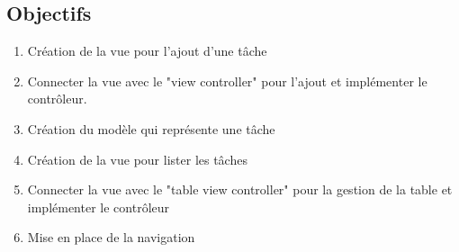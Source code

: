 \subsection{Objectifs}
\begin{enumerate}
	\item Création de la vue pour l’ajout d’une tâche
	\item Connecter la vue avec le "view controller" pour l’ajout et implémenter le contrôleur.
	\item Création du modèle qui représente une tâche
	\item Création de la vue pour lister les tâches
	\item Connecter la vue avec le "table view controller" pour la gestion de la table et implémenter le contrôleur
	\item  Mise en place de la navigation
\end{enumerate}